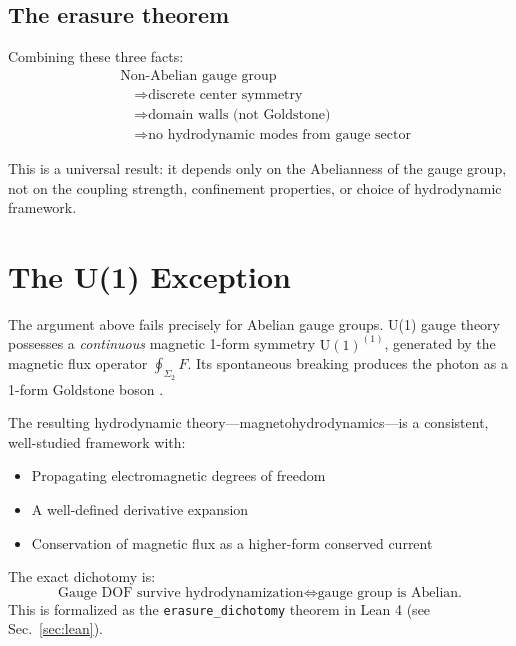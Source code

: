 \documentclass[aps,prl,twocolumn,superscriptaddress,showpacs]{revtex4-2}
\begin{document}
\subsection{The erasure theorem}

Combining these three facts:
\begin{equation}
\boxed{
\begin{aligned}
    &\text{Non-Abelian gauge group} \\
    &\quad\Rightarrow \text{discrete center symmetry} \\
    &\quad\Rightarrow \text{domain walls (not Goldstone)} \\
    &\quad\Rightarrow \text{no hydrodynamic modes from gauge sector}
\end{aligned}
}
\end{equation}

This is a universal result: it depends only on the Abelianness of the
gauge group, not on the coupling strength, confinement properties, or
choice of hydrodynamic framework.

\section{The U(1) Exception}

The argument above fails precisely for Abelian gauge groups. U(1)
gauge theory possesses a \emph{continuous} magnetic 1-form symmetry
$\text{U}(1)^{(1)}$, generated by the magnetic flux operator
$\oint_{\Sigma_2} F$. Its spontaneous breaking produces the photon
as a 1-form Goldstone boson \cite{GrozdanovHofmanIqbal}.

The resulting hydrodynamic theory---magnetohydrodynamics---is a
consistent, well-studied framework with:
\begin{itemize}
    \item Propagating electromagnetic degrees of freedom
    \item A well-defined derivative expansion \cite{HofmanIqbal}
    \item Conservation of magnetic flux as a higher-form conserved current
\end{itemize}

The exact dichotomy is:
\begin{equation}
    \text{Gauge DOF survive hydrodynamization}
    \iff \text{gauge group is Abelian.}
\end{equation}
This is formalized as the \texttt{erasure\_dichotomy} theorem in
Lean 4 (see Sec.~\ref{sec:lean}).
\end{document}

